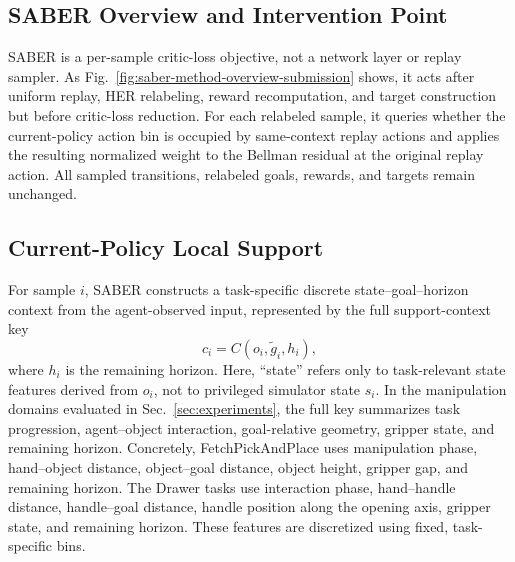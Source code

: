 \documentclass[letterpaper]{article}
\begin{document}
\subsection{SABER Overview and Intervention Point}

SABER is a per-sample critic-loss objective, not a network layer or
replay sampler. As Fig.~\ref{fig:saber-method-overview-submission}
shows, it acts after uniform replay, HER relabeling, reward
recomputation, and target construction but before critic-loss
reduction. For each relabeled sample, it queries whether the
current-policy action bin is occupied by same-context replay actions
and applies the resulting normalized weight to the Bellman residual
at the original replay action. All sampled transitions, relabeled
goals, rewards, and targets remain unchanged.

\subsection{Current-Policy Local Support}

For sample \(i\), SABER constructs a task-specific discrete
state--goal--horizon context from the agent-observed input, represented
by the full support-context key
\begin{equation}
c_i=C(o_i,\tilde g_i,h_i),
\end{equation}
where \(h_i\) is the remaining horizon. Here, ``state'' refers only to
task-relevant state features derived from \(o_i\), not to privileged
simulator state \(s_i\). In the manipulation domains
evaluated in Sec.~\ref{sec:experiments}, the full key summarizes task progression,
agent--object interaction, goal-relative geometry, gripper state, and
remaining horizon.  Concretely, FetchPickAndPlace uses manipulation
phase, hand--object distance, object--goal distance, object height,
gripper gap, and remaining horizon.  The Drawer tasks use interaction
phase, hand--handle distance, handle--goal distance, handle position
along the opening axis, gripper state, and remaining horizon.  These
features are discretized using fixed, task-specific bins.
\end{document}
